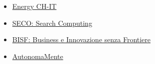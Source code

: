 \begin{itemize}
\tightlist
\item
  \href{http://www.fondazionepolitecnico.it/it/cosa-facciamo/progetti-di-innovazione/item/energy-ch-it-distretto-per-le-tecnologie-e-i-materiali-per-l-efficienza-energetica-dell-insubria}{Energy
  CH-IT}
\item
  \href{https://cordis.europa.eu/project/rcn/88591/factsheet/en}{SECO:
  Search Computing}
\item
  \href{http://www.fondazionepolitecnico.it/it/cosa-facciamo/progetti-di-innovazione/item/bisf-business-e-innovazione-senza-frontiere}{BISF:
  Business e Innovazione senza Frontiere}
\item
  \href{http://autonomamente.como.polimi.it/index85f3.html?option=com_content\&task=view\&id=15\&Itemid=16}{AutonomaMente}
\end{itemize}
